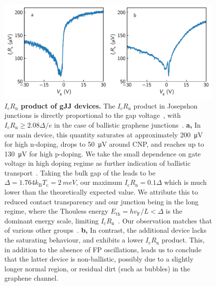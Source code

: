 \begin{figure}[]
	\centering
	\includegraphics[width=\linewidth]{chapter-gJJ/figs/si_icrn}
	\caption{{\bf $I_\text{c} R_\text{n}$ product of gJJ devices.}
		The $I_\text{c} R_\text{n}$ product in Josepshon junctions is directly proportional to the gap voltage~\cite{tinkhamIntroductionSuperconductivity1996}, with $I_\text{c} R_\text{n}\geq2.08\Delta/e$ in the case of ballistic graphene junctions~\cite{titovJosephsonEffectBallistic2006b,cuevasSubharmonicGapStructure2006a}.
		\textbf{a,} In our main device, this quantity saturates at approximately \SI{200}{\micro V} for high n-doping, drops to \SI{50}{\micro V} around CNP, and reaches up to \SI{130}{\micro V} for high p-doping.
		We take the small dependence on gate voltage in high doping regime as further indication of ballistic transport~\cite{mizunoBallisticlikeSupercurrentSuspended2013a,zhuSupercurrentMultipleAndreev2018}.
		Taking the bulk gap of the leads to be $\Delta=1.764 k_\text{B} T_\text{c} = \SI{2}{meV}$, our maximum $I_\text{c} R_\text{n}=0.1\Delta$ which is much lower than the theoretically expected value.
		We attribute this to reduced contact transparency and our junction being in the long regime, where the Thouless energy $E_\text{th}=hv_\text{F}/L < \Delta $ is the dominant energy scale, limiting $I_\text{c} R_\text{n}$~\cite{dubosJosephsonCriticalCurrent2001}.
		Our observation matches that of various other groups~\cite{mizunoBallisticlikeSupercurrentSuspended2013a,benshalomQuantumOscillationsCritical2015,borzenetsBallisticGrapheneJosephson2016a,zhuSupercurrentMultipleAndreev2018}.
		\textbf{b,} In contrast, the additional device lacks the saturating behaviour, and exhibits a lower $I_\text{c}R_\text{n}$ product.
		This, in addition to the absence of FP oscillations, leads us to conclude that the latter device is non-ballistic, possibly due to a slightly longer normal region, or residual dirt (such as bubbles) in the graphene channel.
	}
	\label{gJJfig:icrn}
\end{figure}

